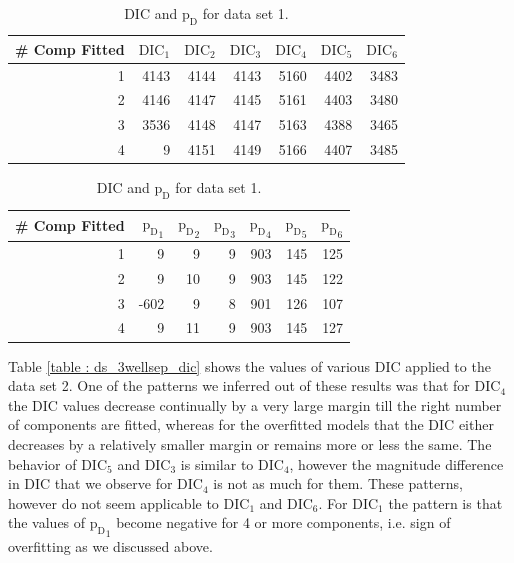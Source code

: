 \begin{table}[!htb]
\centering
\caption{DIC and $\text{p}_\text{D}$ for data set 1.}
\label{table : ds_simple_dic} 
\begin{tabular}{@{}rrrrrrr@{}}
\toprule
\# Comp Fitted & $\text{DIC}_1$ & $\text{DIC}_2$  & $\text{DIC}_3$  & $\text{DIC}_4$  & $\text{DIC}_5$  & $\text{DIC}_6$  \\ \midrule
1      & 4143 & 4144 & 4143 & 5160 & 4402 & 3483 \\
2      & 4146 & 4147 & 4145 & 5161 & 4403 & 3480 \\
3      & 3536 & 4148 & 4147 & 5163 & 4388 & 3465 \\
4      & 9    & 4151 & 4149 & 5166 & 4407 & 3485 \\ \bottomrule
\end{tabular}

\begin{tabular}{@{}rrrrrrr@{}}
\toprule
\# Comp Fitted & ${\text{p}_\text{D}}_1$ & ${\text{p}_\text{D}}_2$ & ${\text{p}_\text{D}}_3$ & ${\text{p}_\text{D}}_4$ & ${\text{p}_\text{D}}_5$ & ${\text{p}_\text{D}}_6$ \\ \midrule
1      & 9    & 9    & 9    & 903  & 145  & 125  \\
2      & 9    & 10   & 9    & 903  & 145  & 122  \\
3      & -602 & 9    & 8    & 901  & 126  & 107  \\
4      & 9    & 11   & 9    & 903  & 145  & 127  \\ \bottomrule
\end{tabular}
\end{table}

Table \ref{table : ds_3wellsep_dic} shows the values of various DIC applied to the data set 2. One of the patterns we inferred out of these results was that for $\text{DIC}_4$ the DIC values decrease continually by a very large margin till the right number of components are fitted, whereas for the overfitted models that the DIC either decreases by a relatively smaller margin or remains more or less the same. The behavior of $\text{DIC}_5$ and $\text{DIC}_3$ is similar to $\text{DIC}_4$, however the magnitude difference in DIC that we observe for $\text{DIC}_4$ is not as much for them. These patterns, however do not seem applicable to $\text{DIC}_1$ and $\text{DIC}_6$. For $\text{DIC}_1$ the pattern is that the values of ${\text{p}_\text{D}}_1$ become negative for 4 or more components, i.e. sign of overfitting as we discussed above.\\

